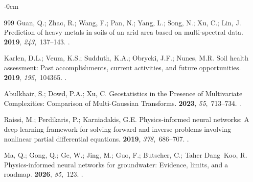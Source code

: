 \documentclass[environremediat,article,accept,pdftex,oneauthor]{Definitions/mdpi}
\begin{document}
\begin{adjustwidth}{-\extralength}{0cm}
\begin{thebibliography}{999}
Guan, Q.; Zhao, R.; Wang, F.; Pan, N.; Yang, L.; Song, N.; Xu, C.; Lin, J.
\newblock Prediction of heavy metals in soils of an arid area based on
  multi-spectral data.
 {\bf 2019}, {\em
  243},~137--143.
.

Karlen, D.L.; Veum, K.S.; Sudduth, K.A.; Obrycki, J.F.; Nunes, M.R.
\newblock Soil health assessment: Past accomplishments, current activities, and
  future opportunities.
 {\bf 2019}, {\em 195},~104365.
.

Abulkhair, S.; Dowd, P.A.; Xu, C.
\newblock Geostatistics in the Presence of Multivariate Complexities:
  Comparison of Multi-Gaussian Transforms.
 {\bf 2023}, {\em 55},~713--734.
.

Raissi, M.; Perdikaris, P.; Karniadakis, G.E.
\newblock Physics-informed neural networks: A deep learning framework for
  solving forward and inverse problems involving nonlinear partial differential
  equations.
 {\bf 2019}, {\em
  378},~686--707.
.

Ma, Q.; Gong, Q.; Ge, W.; Jing, M.; Guo, F.; Butscher, C.; Taher Dang~Koo, R.
\newblock Physics-informed neural networks for groundwater: Evidence, limits,
  and a roadmap.
 {\bf 2026}, {\em 85},~123.
.

\end{thebibliography}
\PublishersNote{}

\end{adjustwidth}
\end{document}
